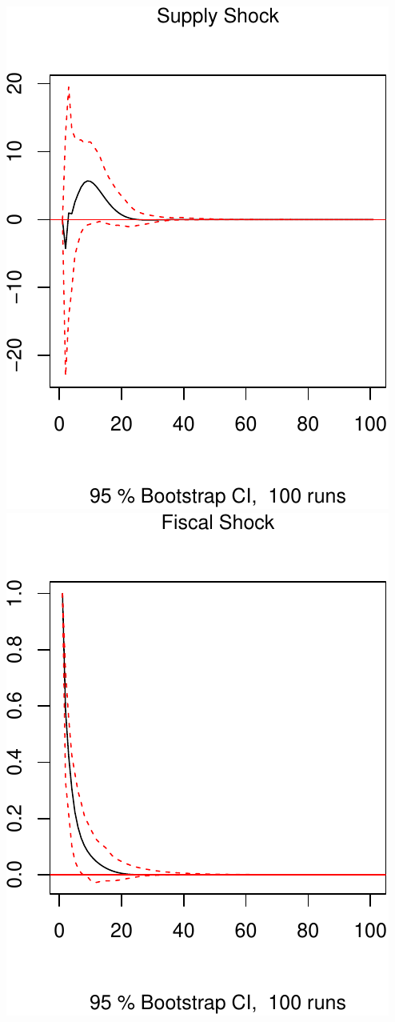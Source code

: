 \documentclass[11pt,preprint, authoryear]{elsarticle}
\numberwithin{equation}{section}
\numberwithin{figure}{section}
\numberwithin{table}{section}
\begin{document}
\includegraphics{TS_proj_files/figure-latex/unnamed-chunk-47-1.pdf}
\includegraphics{TS_proj_files/figure-latex/unnamed-chunk-47-2.pdf}
\end{document}
